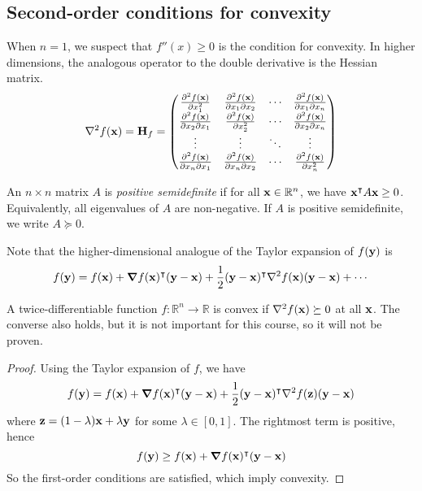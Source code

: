 \subsection{Second-order conditions for convexity}
When \(n = 1\), we suspect that \(f''(x) \geq 0\) is the condition for convexity.
In higher dimensions, the analogous operator to the double derivative is the Hessian matrix.
\[
	\laplacian{f(\vb x)} = \vb H_f = \begin{pmatrix}
		\pdv[2]{f(\vb x)}{x_1}   & \pdv{f(\vb x)}{x_1}{x_2} & \cdots & \pdv{f(\vb x)}{x_1}{x_n} \\
		\pdv{f(\vb x)}{x_2}{x_1} & \pdv[2]{f(\vb x)}{x_2}   & \cdots & \pdv{f(\vb x)}{x_2}{x_n} \\
		\vdots                   & \vdots                   & \ddots & \vdots                   \\
		\pdv{f(\vb x)}{x_n}{x_1} & \pdv{f(\vb x)}{x_n}{x_2} & \cdots & \pdv[2]{f(\vb x)}{x_n}   \\
	\end{pmatrix}
\]
\begin{definition}
	An \(n \times n\) matrix \(A\) is \textit{positive semidefinite} if for all \(\vb x \in \mathbb R^n\), we have \(\vb x^\intercal A \vb x \geq 0\).
	Equivalently, all eigenvalues of \(A\) are non-negative.
	If \(A\) is positive semidefinite, we write \(A \succeq 0\).
\end{definition}
Note that the higher-dimensional analogue of the Taylor expansion of \(f(\vb y)\) is
\[
	f(\vb y) = f(\vb x) + \grad{f(\vb x)}^\transpose (\vb y - \vb x) + \frac{1}{2}(\vb y - \vb x)^\transpose \laplacian{f(\vb x)} (\vb y - \vb x) + \cdots
\]
\begin{theorem}
	A twice-differentiable function \(f \colon \mathbb R^n \to \mathbb R\) is convex if \(\laplacian{f(\vb x)} \succeq 0\) at all \(\vb x\).
	The converse also holds, but it is not important for this course, so it will not be proven.
\end{theorem}
\begin{proof}
	Using the Taylor expansion of \(f\), we have
	\[
		f(\vb y) = f(\vb x) + \grad{f(\vb x)}^\transpose (\vb y - \vb x) + \frac{1}{2}(\vb y - \vb x)^\transpose \laplacian{f(\vb z)} (\vb y - \vb x)
	\]
	where \(\vb z = (1-\lambda)\vb x + \lambda \vb y\) for some \(\lambda \in [0, 1]\).
	The rightmost term is positive, hence
	\[
		f(\vb y) \geq f(\vb x) + \grad{f(\vb x)}^\intercal (\vb y - \vb x)
	\]
	So the first-order conditions are satisfied, which imply convexity.
\end{proof}
